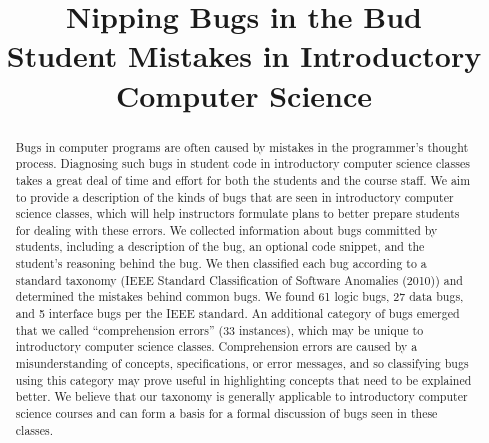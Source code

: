 \documentclass{sig-alternate}
\begin{document}

\title{Nipping Bugs in the Bud\\ Student Mistakes in Introductory Computer Science}
\author{
\alignauthor
}
\maketitle

\setcounter{page}{1}

\def\numlogicIEEE{64 }
\def\numdataIEEE{30 }
\def\numinterfaceIEEE{5 }
\def\numotherIEEE{27 }

\def\numlogic{61 }
\def\numdata{27 }
\def\numinterface{5 }
\def\numcomp{33 }
\def\numtotal{126 }
\def\numedge{31 }

\begin{abstract}

Bugs in computer programs are often caused by mistakes in the
programmer's thought process. Diagnosing such bugs in student code in
introductory computer science classes takes a great deal of time and
effort for both the students and the course staff. We aim to provide a
description of the kinds of bugs that are seen in introductory
computer science classes, which will help instructors formulate plans
to better prepare students for dealing with these errors. We collected
information about bugs committed by students, including a description
of the bug, an optional code snippet, and the student's reasoning
behind the bug. We then classified each bug according to a standard
taxonomy (IEEE Standard Classification of Software Anomalies (2010))
and determined the mistakes behind common bugs. We found \numlogic
logic bugs, \numdata data bugs, and \numinterface interface bugs per
the IEEE standard. An additional category of bugs emerged that we
called ``comprehension errors'' (\numcomp instances), which may be
unique to introductory computer science classes. Comprehension errors
are caused by a misunderstanding of concepts, specifications, or error
messages, and so classifying bugs using this category may prove useful
in highlighting concepts that need to be explained better. We believe
that our taxonomy is generally applicable to introductory computer
science courses and can form a basis for a formal discussion of bugs
seen in these classes.

\end{abstract}
\end{document}
